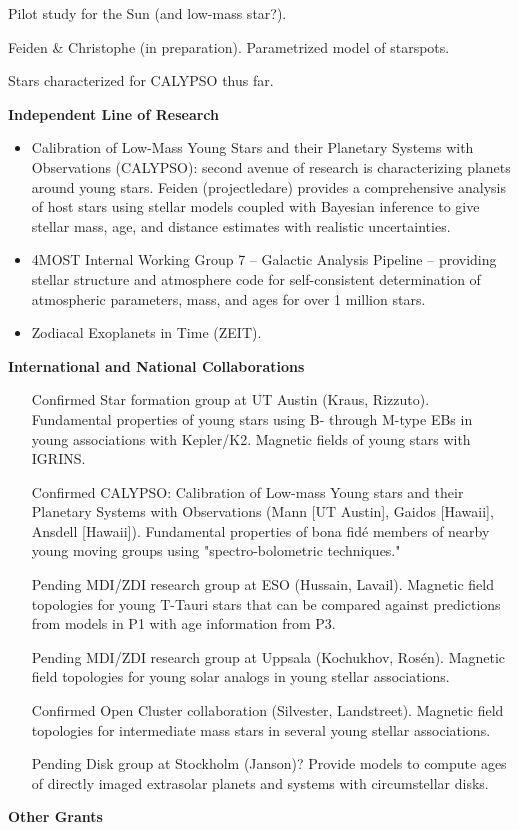 \documentclass[12pt,a4paper]{article}
\begin{document}
Pilot study for the Sun (and low-mass star?).

Feiden \& Christophe (in preparation). Parametrized model of starspots.

Stars characterized for CALYPSO thus far.

{\bf \large Independent Line of Research}
\begin{itemize}
	\item Calibration of Low-Mass Young Stars and their Planetary Systems with Observations (CALYPSO): 
	second avenue of research is characterizing planets around young stars. 
    Feiden (projectledare) provides a comprehensive analysis of host stars using stellar models coupled 
    with Bayesian inference
    to give stellar mass, age, and distance estimates with realistic uncertainties.
	\item 4MOST Internal Working Group 7 -- Galactic Analysis Pipeline -- providing stellar
    structure and atmosphere code for self-consistent determination of atmospheric 
    parameters, mass, and ages for over 1 million stars.
    \item Zodiacal Exoplanets in Time (ZEIT).
\end{itemize}

{\bf \large International and National Collaborations}
\begin{itemize}
  	\item [Confirmed] Star formation group at UT Austin (Kraus, Rizzuto). Fundamental properties of young stars using B- through M-type EBs in young associations with Kepler/K2. Magnetic fields of young stars with IGRINS.
  	\item [Confirmed] CALYPSO: Calibration of Low-mass Young stars and their Planetary Systems with Observations (Mann [UT Austin], Gaidos [Hawaii], Ansdell [Hawaii]). Fundamental properties of bona fid\'{e} members of nearby young moving groups using "spectro-bolometric techniques."
  	\item [Pending] MDI/ZDI research group at ESO (Hussain, Lavail). Magnetic field topologies for young T-Tauri stars that can be compared against predictions from models in P1 with age information from P3.
  	\item [Pending] MDI/ZDI research group at Uppsala (Kochukhov, Ros\'{e}n). Magnetic field topologies for young solar analogs in young stellar associations.
  	\item [Confirmed] Open Cluster collaboration (Silvester, Landstreet). Magnetic field topologies for intermediate mass stars in several young stellar associations.
  	\item [Pending] Disk group at Stockholm (Janson)? Provide models to compute ages of directly imaged extrasolar planets and systems with circumstellar disks.
\end{itemize}


{\bf \large Other Grants}
\end{document}
